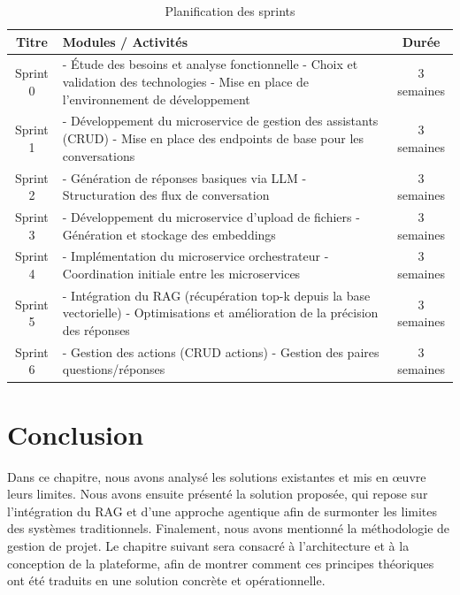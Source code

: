\begin{table}[H]
\centering
\caption{Planification des sprints}
\begin{tabular}{|c|p{9cm}|c|}
\hline
\textbf{Titre} & \textbf{Modules / Activités} & \textbf{Durée} \\ \hline

Sprint 0 & 
- Étude des besoins et analyse fonctionnelle \newline
- Choix et validation des technologies \newline
- Mise en place de l’environnement de développement & 
3 semaines \\ \hline

Sprint 1 & 
- Développement du microservice de gestion des assistants (CRUD) \newline
- Mise en place des endpoints de base pour les conversations & 
3 semaines \\ \hline

Sprint 2 & 
- Génération de réponses basiques via LLM \newline
- Structuration des flux de conversation & 
3 semaines \\ \hline

Sprint 3 & 
- Développement du microservice d’upload de fichiers \newline
- Génération et stockage des embeddings & 
3 semaines \\ \hline

Sprint 4 & 
- Implémentation du microservice orchestrateur \newline
- Coordination initiale entre les microservices & 
3 semaines \\ \hline

Sprint 5 & 
- Intégration du RAG (récupération top-k depuis la base vectorielle) \newline
- Optimisations et amélioration de la précision des réponses& 
3 semaines \\ \hline

Sprint 6 & 
- Gestion des actions (CRUD actions) \newline
- Gestion des paires questions/réponses & 
3 semaines \\ \hline
\end{tabular}
\end{table}


\section{Conclusion}
Dans ce chapitre, nous avons analysé les solutions existantes et mis en œuvre leurs limites. 
Nous avons ensuite présenté la solution proposée, qui repose sur l’intégration du RAG et d’une approche agentique afin de surmonter les limites des systèmes traditionnels. Finalement, nous avons mentionné la méthodologie de gestion de projet.
Le chapitre suivant sera consacré à l’architecture et à la conception de la plateforme, afin de montrer comment ces principes théoriques ont été traduits en une solution concrète et opérationnelle.